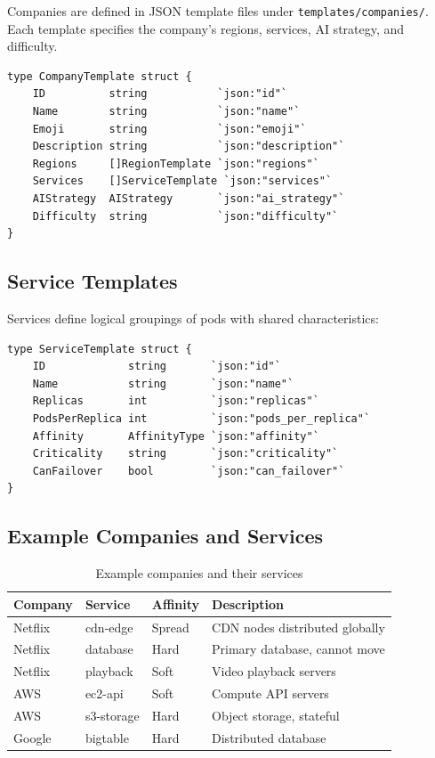 \documentclass[11pt]{article}
\begin{document}
Companies are defined in JSON template files under \texttt{templates/companies/}. Each template specifies the company's regions, services, AI strategy, and difficulty.

\begin{lstlisting}
type CompanyTemplate struct {
    ID          string           `json:"id"`
    Name        string           `json:"name"`
    Emoji       string           `json:"emoji"`
    Description string           `json:"description"`
    Regions     []RegionTemplate `json:"regions"`
    Services    []ServiceTemplate `json:"services"`
    AIStrategy  AIStrategy       `json:"ai_strategy"`
    Difficulty  string           `json:"difficulty"`
}
\end{lstlisting}

\subsection{Service Templates}

Services define logical groupings of pods with shared characteristics:

\begin{lstlisting}
type ServiceTemplate struct {
    ID             string       `json:"id"`
    Name           string       `json:"name"`
    Replicas       int          `json:"replicas"`
    PodsPerReplica int          `json:"pods_per_replica"`
    Affinity       AffinityType `json:"affinity"`
    Criticality    string       `json:"criticality"`
    CanFailover    bool         `json:"can_failover"`
}
\end{lstlisting}

\subsection{Example Companies and Services}

\begin{table}[H]
\centering
\begin{tabular}{@{}llll@{}}
\toprule
\textbf{Company} & \textbf{Service} & \textbf{Affinity} & \textbf{Description} \\
\midrule
Netflix & cdn-edge & Spread & CDN nodes distributed globally \\
Netflix & database & Hard & Primary database, cannot move \\
Netflix & playback & Soft & Video playback servers \\
AWS & ec2-api & Soft & Compute API servers \\
AWS & s3-storage & Hard & Object storage, stateful \\
Google & bigtable & Hard & Distributed database \\
\bottomrule
\end{tabular}
\caption{Example companies and their services}
\label{tab:companies}
\end{table}
\end{document}
